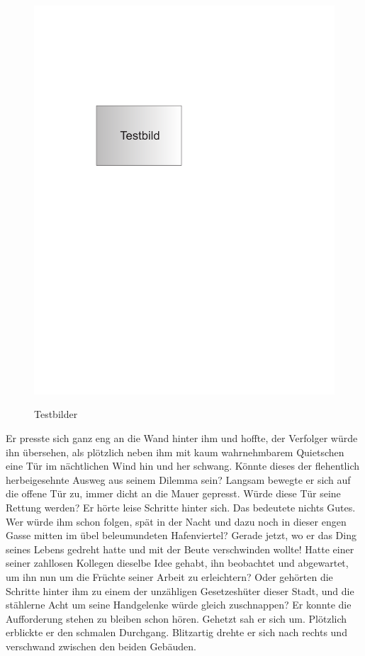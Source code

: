 \begin{figure}[t]
         {\includegraphics[scale=0.8]{bilder/testbild}\label{fig_testbild_b}
    }
    \caption[Testbilder]{Testbilder}
        \label{fig_testbild}
    \end{figure}

Er presste sich ganz eng an die Wand hinter ihm und hoffte, der
Verfolger würde ihn übersehen, als plötzlich neben ihm mit kaum
wahrnehmbarem Quietschen eine Tür im nächtlichen Wind hin und her
schwang. Könnte dieses der flehentlich herbeigesehnte Ausweg aus
seinem Dilemma sein? Langsam bewegte er sich auf die offene Tür
zu, immer dicht an die Mauer gepresst. Würde diese Tür seine
Rettung werden? Er hörte leise Schritte hinter sich. Das bedeutete
nichts Gutes. Wer würde ihm schon folgen, spät in der Nacht und
dazu noch in dieser engen Gasse mitten im übel beleumundeten
Hafenviertel? Gerade jetzt, wo er das Ding seines Lebens gedreht
hatte und mit der Beute verschwinden wollte! Hatte einer seiner
zahllosen Kollegen dieselbe Idee gehabt, ihn beobachtet und
abgewartet, um ihn nun um die Früchte seiner Arbeit zu
erleichtern? Oder gehörten die Schritte hinter ihm zu einem der
unzähligen Gesetzeshüter dieser Stadt, und die stählerne Acht um
seine Handgelenke würde gleich zuschnappen? Er konnte die
Aufforderung stehen zu bleiben schon hören. Gehetzt sah er sich
um. Plötzlich erblickte er den schmalen Durchgang. Blitzartig
drehte er sich nach rechts und verschwand zwischen den beiden
Gebäuden.


